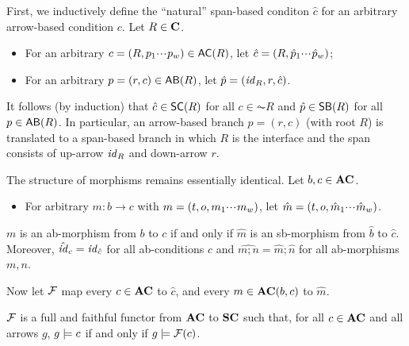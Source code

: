 First, we inductively define the ``natural'' span-based conditon $\hat c$ for an arbitrary arrow-based condition $c$. Let $R\in\mathbf{C}$.
\begin{itemize}
\item For an arbitrary $c=(R,p_1\ccdots p_w)\in \AC R$, let $\hat c=(R,\hat p_1{\cdotp\mkern-2mu\cdotp\mkern-2mu\cdotp\mkern1mu} \hat p_w)$; 
\item For an arbitrary $p=(r,c)\in \AB R$, let $\hat p=(\mathit{id}_R,r,\hat c)$.
\end{itemize}
%
It follows (by induction) that $\hat c\in \SC R$ for all $c\in \AC R$ and $\hat p\in \SB R$ for all $p\in \AB R$. In particular, an arrow-based branch $p=(r,c)$ (with root $R$) is translated to a span-based branch in which $R$ is the interface and the span consists of up-arrow $\mathit{id}_R$ and down-arrow $r$.

The structure of morphisms remains essentially identical. Let $b,c\in \mathbf{AC}$.
%
\begin{itemize}
\item For arbitrary $m:b\to c$ with $m=(t,o,m_1{\cdotp\mkern-2mu\cdotp\mkern-2mu\cdotp\mkern1mu} m_w)$, let $\hat m=(t,o,\hat m_1{\cdotp\mkern-2mu\cdotp\mkern-2mu\cdotp\mkern1mu} \hat m_w)$.
\end{itemize}
%
\begin{proposition}
$m$ is an ab-morphism from $b$ to $c$ if and only if $\hat m$ is an sb-morphism from $\hat b$ to $\hat c$. Moreover, $\hat {\mathit{id}}_c=\mathit{id}_{\hat c}$ for all ab-conditions $c$ and $\widehat{m;n}=\hat m;\hat n$ for all ab-morphisms $m,n$.
\end{proposition}
%
Now let $\mathcal{F}$ map every $c\in \mathbf{AC}$ to $\hat c$, and every $m\in \mathbf{AC}(b,c)$ to $\hat m$.

\begin{theorem}
$\mathcal{F}$ is a full and faithful functor from $\mathbf{AC}$ to $\mathbf{SC}$ such that, for all $c\in \mathbf{AC}$ and all arrows $g$, $g\models c$ if and only if $g\models \mathcal{F}(c)$.
\end{theorem}




